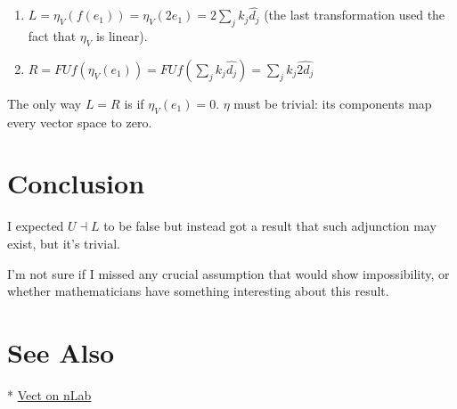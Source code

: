 \documentclass[12pt]{article}
\begin{document}
\begin{enumerate}
  \item $L = \eta_V(f(e_1)) = \eta_V(2e_1) = 2\sum_j k_{j} \hat{d_{j}}$ (the last transformation used the fact that $\eta_V$ is linear).
  \item $R = FUf(\eta_V(e_1)) = FUf\left(\sum_j k_{j} \hat{d_{j}}\right)
      = \sum_j k_{j} \widehat{2d_{j}}$
\end{enumerate}

The only way $L = R$ is if $\eta_V(e_1) = 0$. $\eta$ must be trivial: its components map every
vector space to zero.

\section{Conclusion}

I expected $U \dashv L$ to be false but instead got a result that such
adjunction may exist, but it's trivial.

I'm not sure if I missed any crucial assumption that would show impossibility,
or whether mathematicians have something interesting about this result.

\section{See Also}

* \href{https://ncatlab.org/nlab/show/Vect}{Vect on nLab}
\end{document}

